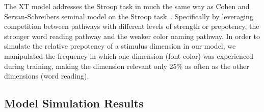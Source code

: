 

The XT model addresses the Stroop task in much the same way as Cohen and Servan-Schreibers seminal model on the Stroop task~\cite{CohenJD:1990:Stroop}.  Specifically by leveraging competition between pathways with different levels of strength or prepotency, the stronger word reading pathway and the weaker color naming pathway.  In order to simulate the relative prepotency of a stimulus dimension in our model, we manipulated the frequency in which one dimension (font color) was experienced during training, making the dimension relevant only 25\% as often as the other dimensions (word reading).  

\subsection{Model Simulation Results}


